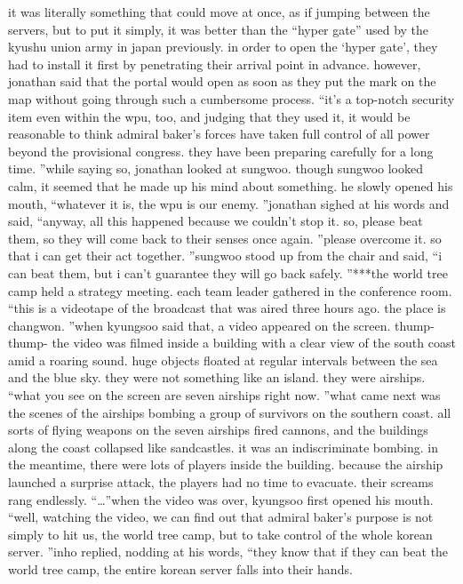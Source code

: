 it was literally something that could move at once, as if jumping between the servers, but to put it simply, it was better than the “hyper gate” used by the kyushu union army in japan previously.
in order to open the ‘hyper gate’, they had to install it first by penetrating their arrival point in advance.
 however, jonathan said that the portal would open as soon as they put the mark on the map without going through such a cumbersome process.
“it’s a top-notch security item even within the wpu, too, and judging that they used it, it would be reasonable to think admiral baker’s forces have taken full control of all power beyond the provisional congress.
 they have been preparing carefully for a long time.
”while saying so, jonathan looked at sungwoo.
though sungwoo looked calm, it seemed that he made up his mind about something.
he slowly opened his mouth, “whatever it is, the wpu is our enemy.
”jonathan sighed at his words and said, “anyway, all this happened because we couldn’t stop it.
 so, please beat them, so they will come back to their senses once again.
”please overcome it.
 so that i can get their act together.
”sungwoo stood up from the chair and said, “i can beat them, but i can’t guarantee they will go back safely.
”***the world tree camp held a strategy meeting.
 each team leader gathered in the conference room.
“this is a videotape of the broadcast that was aired three hours ago.
 the place is changwon.
”when kyungsoo said that, a video appeared on the screen.
thump- thump-
the video was filmed inside a building with a clear view of the south coast amid a roaring sound.
huge objects floated at regular intervals between the sea and the blue sky.
 they were not something like an island.
 they were airships.
“what you see on the screen are seven airships right now.
”what came next was the scenes of the airships bombing a group of survivors on the southern coast.
 all sorts of flying weapons on the seven airships fired cannons, and the buildings along the coast collapsed like sandcastles.
 it was an indiscriminate bombing.
in the meantime, there were lots of players inside the building.
because the airship launched a surprise attack, the players had no time to evacuate.
their screams rang endlessly.
“…”when the video was over, kyungsoo first opened his mouth.
“well, watching the video, we can find out that admiral baker’s purpose is not simply to hit us, the world tree camp, but to take control of the whole korean server.
”inho replied, nodding at his words, “they know that if they can beat the world tree camp, the entire korean server falls into their hands.
